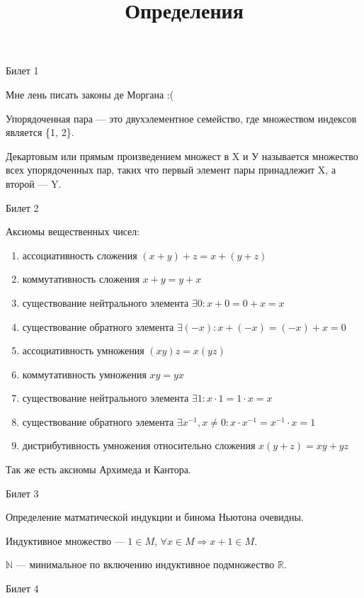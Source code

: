 \documentclass[12pt,a4paper]{article}
\title{Определения}
\begin{document}
	
 
\hypersetup{pdfstartview=FitH,  linkcolor=linkcolor,urlcolor=urlcolor, colorlinks=true}

\begin{center}
Билет 1
\end{center}

Мне лень писать законы де Моргана :(

Упорядоченная пара --- это двухэлементное семейство, где множеством индексов является \{1, 2\}.

Декартовым или прямым произведением множест в X и У называется множество всех упорядоченных пар, таких что первый элемент пары принадлежит X, а второй --- Y.

\begin{center}
Билет 2
\end{center}

Аксиомы вещественных чисел:
\begin{enumerate}
\item ассоциативность сложения $(x+y)+z=x+(y+z)$
\item коммутативность сложения $x+y=y+x$
\item существование нейтрального элемента $\exists 0: x+0=0+x=x$
\item существование обратного элемента $\exists (-x): x+(-x)=(-x)+x=0$
\item ассоциативность умножения $(xy)z=x(yz)$
\item коммутативность умножения $xy=yx$
\item существование нейтрального элемента $\exists 1: x \cdot 1 = 1 \cdot x = x$
\item существование обратного элемента $\exists x^{-1}, x \ne 0: x \cdot x^{-1}= x^{-1} \cdot x = 1$
\item дистрибутивность умножения относительно сложения $x(y+z)=xy+yz$
\end{enumerate}

Так же есть аксиомы Архимеда и Кантора.

\begin{center}
Билет 3
\end{center}

Определение матматической индукции и бинома Ньютона очевидны.

Индуктивное множество --- $1 \in M$, $\forall x \in M \Rightarrow x+1 \in M$.

$\mathbb{N}$ --- минимальное по включению индуктивное подмножество $\mathbb{R}$. 

\begin{center}
Билет 4
\end{center}
\end{document}
